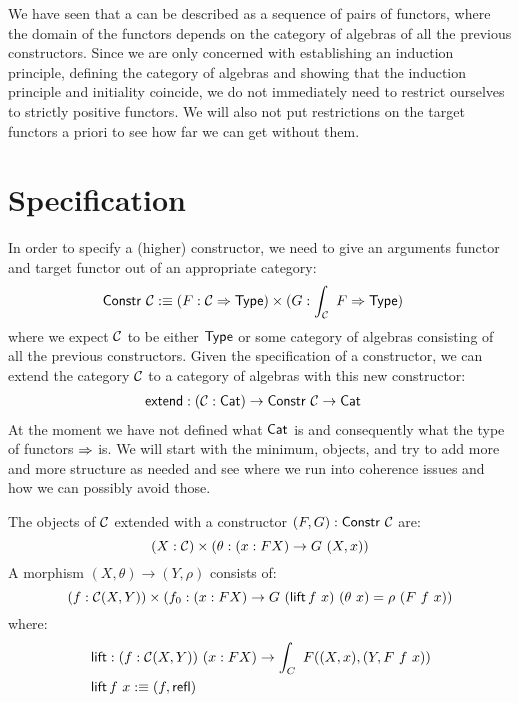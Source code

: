 \documentclass[a4paper,10pt]{report}
\begin{document}
We have seen that a \hit can be described as a sequence of pairs of
functors, where the domain of the functors depends on the category of
algebras of all the previous constructors. Since we are only concerned
with establishing an induction principle, defining the category of
algebras and showing that the induction principle and initiality
coincide, we do not immediately need to restrict ourselves to strictly
positive functors. We will also not put restrictions on the target
functors a priori to see how far we can get without them.

\section{Specification}
\label{sec:hitspec}

In order to specify a (higher) constructor, we need to give an
arguments functor and target functor out of an appropriate category:
%
\begin{align*}
  &\mathsf{Constr}\ \mathcal{C} :\equiv (F : \mathcal{C} \Rightarrow \mathsf{Type}) \times (G : \int_{\mathcal{C}}\ F \Rightarrow \mathsf{Type})
\end{align*}
%
where we expect $\mathcal{C}$ to be either $\mathsf{Type}$ or some category of algebras
consisting of all the previous constructors. Given the specification
of a constructor, we can extend the category $\mathcal{C}$ to a category of
algebras with this new constructor:
%
\begin{align*}
  &\mathsf{extend} : (\mathcal{C} : \mathsf{Cat}) \to \mathsf{Constr}\ \mathcal{C} \to \mathsf{Cat}
\end{align*}
%
At the moment we have not defined what $\mathsf{Cat}$ is and consequently what
the type of functors $\Rightarrow$ is. We will start with the minimum, \ie
objects, and try to add more and more structure as needed and see
where we run into coherence issues and how we can possibly avoid
those.

The objects of $\mathcal{C}$ extended with a constructor $(F,G) : \mathsf{Constr}\ \mathcal{C}$ are:
$$
(X : \C) \times (\theta : (x : FX) \to G\ (X,x))
$$
A morphism $(X, \theta) \to (Y, \rho)$ consists of:
$$
(f : \mathcal{C}(X,Y)) \times (f_0 : (x : FX) \to G\ (\operatorname{\mathsf{lift}} f\ x)\ (\theta\ x) = \rho\ (F\ f\ x))
$$
where:
%
\begin{align*}
&\operatorname{\mathsf{lift}} : (f : \mathcal{C}(X,Y))\ (x : FX) \to \int_{C}\ F ((X,x),(Y,F\ f\ x)) \\
&\operatorname{\mathsf{lift}} f\ x :\equiv (f , \operatorname{\mathsf{refl}})
\end{align*}
%
\end{document}

